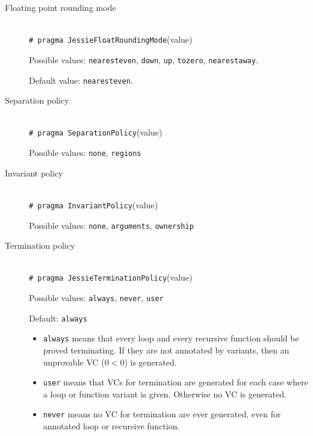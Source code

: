 \documentclass[a4paper,11pt,twoside,openright]{report}
\begin{document}
\begin{description}
\begin{itemize}
  \end{itemize}

\item[Floating point rounding mode] ~\\

  \texttt{\# pragma JessieFloatRoundingMode}(value)

  Possible values: \texttt{nearesteven}, \texttt{down}, \texttt{up},
  \texttt{tozero}, \texttt{nearestaway}.

  Default value: \texttt{nearesteven}.


\item[Separation policy]~\\

  \texttt{\# pragma SeparationPolicy}(value)

  Possible values: \texttt{none}, \texttt{regions}

\item[Invariant policy]~\\

  \texttt{\# pragma InvariantPolicy}(value)

  Possible values: \texttt{none}, \texttt{arguments}, \texttt{ownership}

\item[Termination policy]~\\

  \texttt{\# pragma JessieTerminationPolicy}(value)

  Possible values: \texttt{always}, \texttt{never}, \texttt{user}

  Default: \texttt{always}

  \begin{itemize}
  \item \texttt{always} means that every loop and every recursive
    function should be proved terminating. If they are not annotated
    by variants, then an unprovable VC ($0<0$) is generated.

  \item \texttt{user} means that VCs for termination are generated for
    each case where a loop or function variant is given. Otherwise no
    VC is generated.

  \item \texttt{never} means no VC for termination are ever generated,
    even for annotated loop or recursive function.

  \end{itemize}

\end{description}
\end{document}
